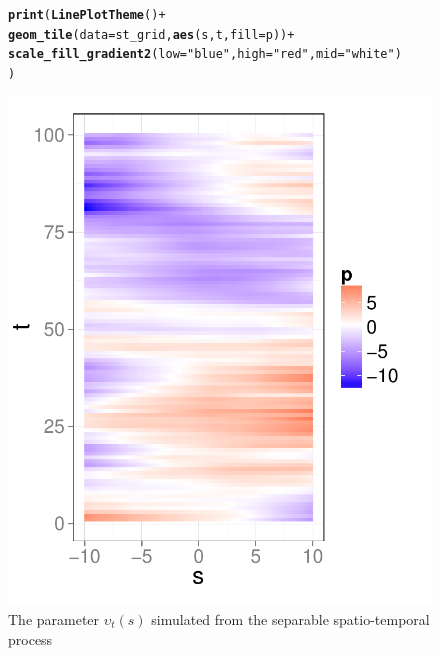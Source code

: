 \documentclass[a4paper,11pt]{article}\usepackage[]{graphicx}\usepackage[]{color}
\makeatletter
\def\maxwidth{ %
  \ifdim\Gin@nat@width>\linewidth
    \linewidth
  \else
    \Gin@nat@width
  \fi
}
\newcommand{\hlstr}[1]{\textcolor[rgb]{0.192,0.494,0.8}{#1}}%
\newcommand{\hlopt}[1]{\textcolor[rgb]{0,0,0}{#1}}%
\newcommand{\hlstd}[1]{\textcolor[rgb]{0.345,0.345,0.345}{#1}}%
\newcommand{\hlkwc}[1]{\textcolor[rgb]{0.333,0.667,0.333}{#1}}%
\newcommand{\hlkwd}[1]{\textcolor[rgb]{0.737,0.353,0.396}{\textbf{#1}}}%
\newenvironment{kframe}{%
 \def\at@end@of@kframe{}%
 \ifinner\ifhmode%
  \def\at@end@of@kframe{\end{minipage}}%
  \begin{minipage}{\columnwidth}%
 \fi\fi%
 \def\FrameCommand##1{\hskip\@totalleftmargin \hskip-\fboxsep
 \colorbox{shadecolor}{##1}\hskip-\fboxsep
     \hskip-\linewidth \hskip-\@totalleftmargin \hskip\columnwidth}%
 \MakeFramed {\advance\hsize-\width
   \@totalleftmargin\z@ \linewidth\hsize
   \@setminipage}}%
 {\par\unskip\endMakeFramed%
 \at@end@of@kframe}
\newenvironment{knitrout}{}{} %
\makeatother
\begin{document}
\begin{figure}
\begin{center}
\begin{knitrout}
\color{fgcolor}\begin{kframe}
\begin{alltt}
\hlkwd{print}\hlstd{(}\hlkwd{LinePlotTheme}\hlstd{()} \hlopt{+}
        \hlkwd{geom_tile}\hlstd{(}\hlkwc{data}\hlstd{=st_grid,}\hlkwd{aes}\hlstd{(s,t,}\hlkwc{fill}\hlstd{=p))} \hlopt{+}
        \hlkwd{scale_fill_gradient2}\hlstd{(}\hlkwc{low}\hlstd{=}\hlstr{"blue"}\hlstd{,}\hlkwc{high}\hlstd{=}\hlstr{"red"}\hlstd{,}\hlkwc{mid}\hlstd{=}\hlstr{"white"}\hlstd{)}
      \hlstd{)}
\end{alltt}
\end{kframe}
\includegraphics[width=\maxwidth]{figure/upsilon-plot2-1} 

\end{knitrout}
\end{center}
\caption{The parameter $\upsilon_t(s)$ simulated from the separable spatio-temporal process}
\label{fig:upsilon}
\end{figure}
\end{document}
